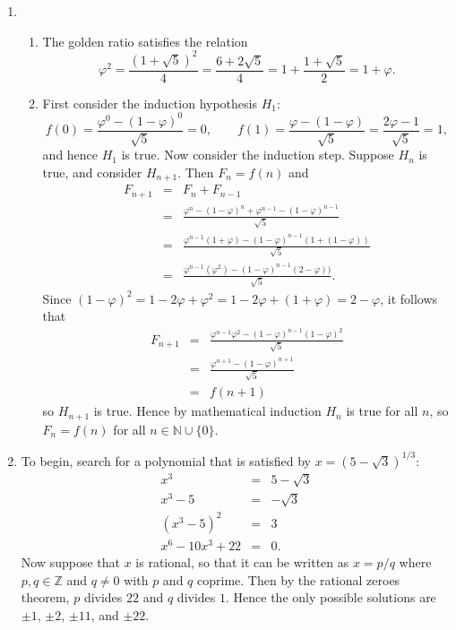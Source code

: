\documentclass[12pt,letterpaper]{article}
\newcommand{\N}{\mathbb{N}}
\newcommand{\Z}{\mathbb{Z}}
\begin{document}
\begin{enumerate}
  \item 
    \begin{enumerate}
      \item The golden ratio satisfies the relation 
	\[
	\varphi^2 = \frac{(1+\sqrt{5})^2}{4} = \frac{6+2\sqrt{5}}{4} = 1 + \frac{1+\sqrt{5}}{2} = 1 + \varphi.
	\]
      \item First consider the induction hypothesis $H_1$:
	\[
	f(0)= \frac{\varphi^0 - (1-\varphi)^0}{\sqrt{5}} = 0, \qquad f(1) = \frac{\varphi- (1-\varphi)}{\sqrt{5}} = \frac{2\varphi-1}{\sqrt{5}} = 1,
	\]
	and hence $H_1$ is true. Now consider the induction step. Suppose $H_n$
	is true, and consider $H_{n+1}$. Then $F_n=f(n)$ and
	\begin{eqnarray*}
	  F_{n+1} &=& F_n+F_{n-1} \\
	  &=& \frac{\varphi^n - (1-\varphi)^n + \varphi^{n-1} - (1-\varphi)^{n-1}}{\sqrt{5}} \\
	  &=& \frac{\varphi^{n-1}(1+\varphi) - (1-\varphi)^{n-1} ( 1+ (1-\varphi))}{\sqrt{5}} \\
	  &=& \frac{\varphi^{n-1}(\varphi^2) - (1-\varphi)^{n-1} ( 2-\varphi))}{\sqrt{5}}.
	\end{eqnarray*}
	Since $(1-\varphi)^2 = 1-2\varphi+\varphi^2 = 1-2\varphi+(1+\varphi) = 2-\varphi$, it follows
	that
	\begin{eqnarray*}
	  F_{n+1} &=&  \frac{\varphi^{n-1}\varphi^2 - (1-\varphi)^{n-1}(1-\varphi)^2}{\sqrt{5}} \\
	  &=& \frac{\varphi^{n+1} - (1-\varphi)^{n+1}}{\sqrt{5}} \\
	  &=& f(n+1)
	\end{eqnarray*}
	so $H_{n+1}$ is true. Hence by mathematical induction $H_n$ is true for
	all $n$, so $F_n=f(n)$ for all $n \in \N \cup \{0\}$.
    \end{enumerate}
  \item To begin, search for a polynomial that is satisfied by
    $x=(5-\sqrt{3})^{1/3}$:
    \begin{eqnarray*}
      x^3 &=& 5-\sqrt{3} \\
      x^3 - 5 &=& -\sqrt{3} \\
      (x^3-5)^2 &=& 3 \\
      x^6 - 10x^3 + 22 &=& 0.
    \end{eqnarray*}
    Now suppose that $x$ is rational, so that it can be written as $x=p/q$
    where $p,q \in \Z$ and $q \ne 0$ with $p$ and $q$ coprime. Then by the
    rational zeroes theorem, $p$ divides $22$ and $q$ divides $1$. Hence the
    only possible solutions are $\pm 1$, $\pm 2$, $\pm 11$, and $\pm 22$.

\end{enumerate}
\end{document}
